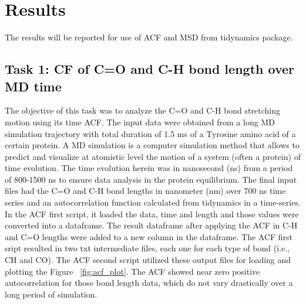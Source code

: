 \documentclass{article}
\begin{document}
\section{Results}

The results will be reported for use of ACF and MSD from tidynamics package\cite{Buyl2018}.

\subsection{Task 1: CF of C=O and C-H bond length over MD time}

The objective of this task was to analyze the C=O and C-H bond stretching motion using its time ACF. The input data were obtained from a long MD simulation trajectory with total duration of 1.5 ms of a Tyrosine amino acid of a certain protein. A MD simulation is a computer simulation method that allows to predict and visualize at atomistic level the motion of a system (often a protein) of time evolution. The time evolution herein was in nanosecond (ns) from a period of 800-1500 ns to ensure data analysis in the protein equilibrium. The final input files had the C=O and C-H bond lengths in nanometer (nm) over 700 ns time series and an autocorrelation function calculated from tidynamics \cite{Buyl2018}in a time-series. In the ACF first script, it loaded the data, time and length and those values were converted into a dataframe. The result dataframe after applying the ACF in C-H and C=O lengths were added to a new column in the dataframe. The ACF first sript resulted in two txt intermediate files, each one for each type of bond (i.e., CH and CO). The ACF second script utilized these output files for loading and plotting the Figure ~\ref{fig:acf_plot}. The ACF showed near zero positive autocorrelation for those bond length data, which do not vary drastically over a long period of simulation.
\end{document}
